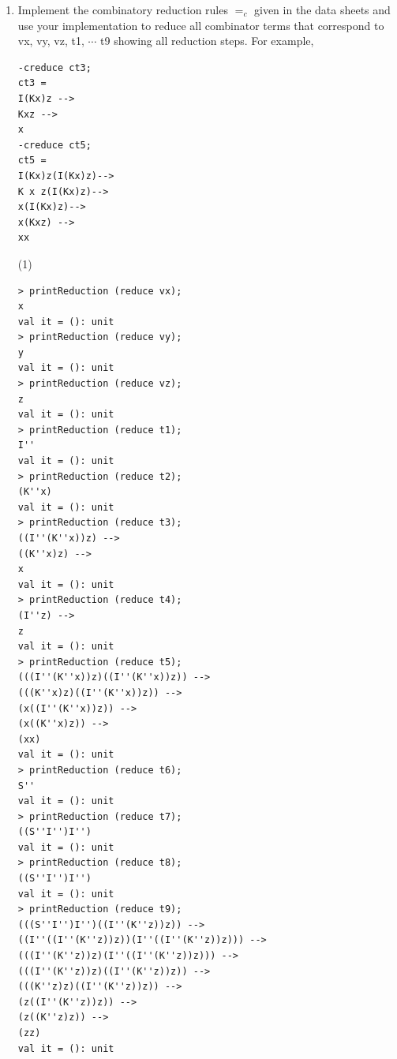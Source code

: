 \documentclass[11pt]{article}
\begin{document}
\begin{enumerate}
\begin{verbatim}
> subterms vx;
val it = [CID "x"]: COM list
> subterms vy;
val it = [CID "y"]: COM list
> subterms vz;
val it = [CID "z"]: COM list
> subterms t1;
val it = [CI]: COM list
> subterms t2;
val it = [CAPP (CK, CID "x"), CK, CID "x"]: COM list
> subterms t3;
val it =
   [CAPP (CAPP (CI, CAPP (CK, CID "x")), CID "z"),
    CAPP (CI, CAPP (CK, CID "x")), CI, CAPP (CK, CID "x"), CK, CID "x",
    CID "z"]: COM list
> subterms t4;
val it = [CAPP (CI, CID "z"), CI, CID "z"]: COM list
> subterms t5;
val it =
   [CAPP
     (CAPP (CAPP (CI, CAPP (CK, CID "x")), CID "z"),
      CAPP (CAPP (CI, CAPP (CK, CID "x")), CID "z")),
    CAPP (CAPP (CI, CAPP (CK, CID "x")), CID "z"),
    CAPP (CI, CAPP (CK, CID "x")), CI, CAPP (CK, CID "x"), CK, CID "x",
    CID "z"]: COM list
> subterms t6;
val it = [CS]: COM list
> subterms t7;
val it = [CAPP (CAPP (CS, CI), CI), CAPP (CS, CI), CS, CI]: COM list
> subterms t8;
val it = [CAPP (CAPP (CS, CI), CI), CAPP (CS, CI), CS, CI]: COM list
> subterms t9;
val it =
   [CAPP
     (CAPP (CAPP (CS, CI), CI),
      CAPP (CAPP (CI, CAPP (CK, CID "z")), CID "z")),
    CAPP (CAPP (CS, CI), CI), CAPP (CS, CI), CS,
    CAPP (CAPP (CI, CAPP (..., ...)), CID "z"),
    CAPP (CI, CAPP (CK, CID "z")), CI, CAPP (CK, CID "z"), CK, CID "z"]:
   COM list
\end{verbatim}
\pagebreak
\item
  Implement the combinatory reduction rules $=_c$ given in the data sheets and use your implementation to reduce
  all combinator terms that correspond to  vx, vy, vz, t1, $\cdots$ t9 showing all reduction steps.  
  For example,
\begin{verbatim}
-creduce ct3;
ct3 =
I(Kx)z -->
Kxz -->
x
-creduce ct5;
ct5 =
I(Kx)z(I(Kx)z)-->
K x z(I(Kx)z)-->
x(I(Kx)z)-->
x(Kxz) -->
xx
  \end{verbatim}
   \hfill{(1)} %

\begin{verbatim}
> printReduction (reduce vx);
x
val it = (): unit
> printReduction (reduce vy);
y
val it = (): unit
> printReduction (reduce vz);
z
val it = (): unit
> printReduction (reduce t1);
I''
val it = (): unit
> printReduction (reduce t2);
(K''x)
val it = (): unit
> printReduction (reduce t3);
((I''(K''x))z) -->
((K''x)z) -->
x
val it = (): unit
> printReduction (reduce t4);
(I''z) -->
z
val it = (): unit
> printReduction (reduce t5);
(((I''(K''x))z)((I''(K''x))z)) -->
(((K''x)z)((I''(K''x))z)) -->
(x((I''(K''x))z)) -->
(x((K''x)z)) -->
(xx)
val it = (): unit
> printReduction (reduce t6);
S''
val it = (): unit
> printReduction (reduce t7);
((S''I'')I'')
val it = (): unit
> printReduction (reduce t8);
((S''I'')I'')
val it = (): unit
> printReduction (reduce t9);
(((S''I'')I'')((I''(K''z))z)) -->
((I''((I''(K''z))z))(I''((I''(K''z))z))) -->
(((I''(K''z))z)(I''((I''(K''z))z))) -->
(((I''(K''z))z)((I''(K''z))z)) -->
(((K''z)z)((I''(K''z))z)) -->
(z((I''(K''z))z)) -->
(z((K''z)z)) -->
(zz)
val it = (): unit


\end{verbatim}
\end{enumerate}
\end{document}
